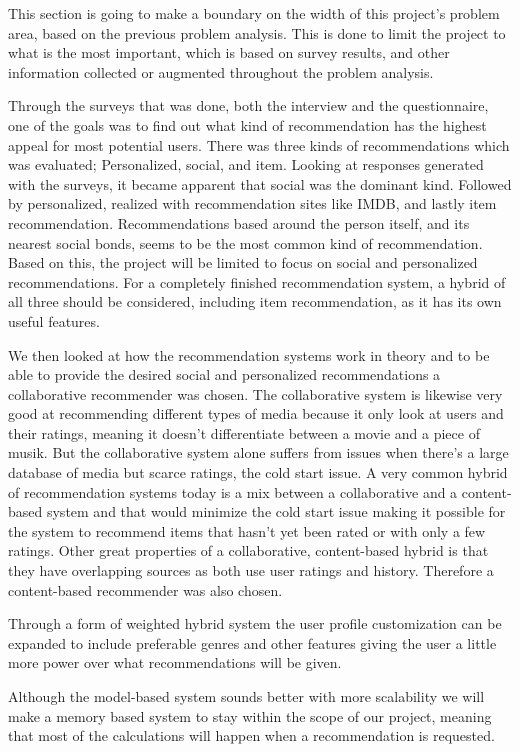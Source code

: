 This section is going to make a boundary on the width of this project’s problem area, based on the previous problem analysis. This is done to limit the project to what is the most important, which is based on survey results, and other information collected or augmented throughout the problem analysis.

Through the surveys that was done, both the interview and the questionnaire, one of the goals was to find out what kind of recommendation has the highest appeal for most potential users. There was three kinds of recommendations which was evaluated; Personalized, social, and item. Looking at responses generated with the surveys, it became apparent that social was the dominant kind. Followed by personalized, realized with recommendation sites like IMDB, and lastly item recommendation. Recommendations based around the person itself, and its nearest social bonds, seems to be the most common kind of recommendation. Based on this, the project will be limited to focus on social and personalized recommendations. For a completely finished recommendation system, a hybrid of all three should be considered, including item recommendation, as it has its own useful features.

We then looked at how the recommendation systems work in theory and to be able to provide the desired social and personalized recommendations a collaborative recommender was chosen. The collaborative system is likewise very good at recommending different types of media because it only look at users and their ratings, meaning it doesn't differentiate between a movie and a piece of musik.  But the collaborative system alone suffers from issues when there's a large database of media but scarce ratings, the cold start issue. A very common hybrid of recommendation systems today is a mix between a collaborative and a content-based system and that would minimize the cold start issue making it possible for the system to recommend items that hasn't yet been rated or with only a few ratings. Other great properties of a collaborative, content-based hybrid is that they have overlapping sources as both use user ratings and history. Therefore a content-based recommender was also chosen. 

Through a form of weighted hybrid system the user profile customization can be expanded to include preferable genres and other features giving the user a little more power over what recommendations will be given. 

Although the model-based system sounds better with more scalability we will make a memory based system to stay within the scope of our project, meaning that most of the calculations will happen when a recommendation is requested.

